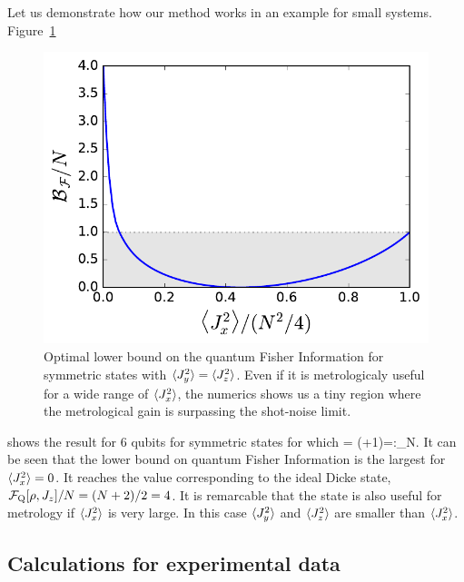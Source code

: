Let us demonstrate how our method works in an example for small systems.
Figure~\ref{fig:lt-symmetric-dicke-6-bound}
\begin{figure}
  \centering
  \includegraphics[scale=.65]{img/plots/LT_dicke_edge.pdf}
  \caption{Optimal lower bound on the quantum Fisher Information for symmetric states with $\langle J_y^2 \rangle=\langle J_z^2 \rangle$. Even if it is metrologicaly useful for a wide range of $\langle J_x^2 \rangle$, the numerics shows us a tiny region where the metrological gain is surpassing the shot-noise limit.}
  \label{fig:lt-symmetric-dicke-6-bound}
\end{figure}
shows the result for 6 qubits for symmetric states for which
\be
   = (+1)=:_N.
\ee
It can be seen that the lower bound on quantum Fisher Information is the largest for $\langle J_x^2 \rangle=0$.
It reaches the value corresponding to the ideal Dicke state, $\mathcal{F}_{\textnormal{Q}}[\rho,J_z]/N=(N+2)/2=4$.
It is remarcable that the state is also useful for metrology if $\langle J_x^2 \rangle$ is very large.
In this case $\langle J_y^2 \rangle$ and $\langle J_z^2 \rangle$ are smaller than $\langle J_x^2 \rangle$.

\subsection{Calculations for experimental data}

